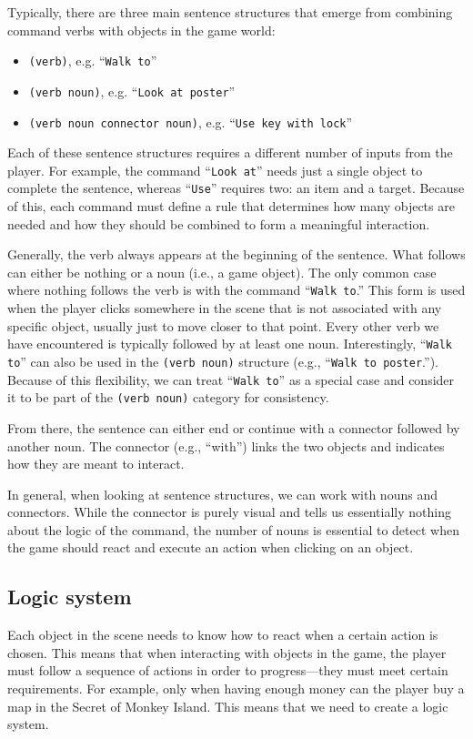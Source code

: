 Typically, there are three main sentence structures that emerge from combining command verbs with objects in the game world:
\begin{itemize}
    \item \verb|(verb)|, e.g. “\texttt{Walk to}”
    \item \verb|(verb noun)|, e.g. “\texttt{Look at poster}”
    \item \verb|(verb noun connector noun)|, e.g. “\texttt{Use key with lock}”
\end{itemize}

Each of these sentence structures requires a different number of inputs from the player. For example, the command “\texttt{Look at}” needs just a single object to complete the sentence, whereas “\texttt{Use}” requires two: an item and a target. Because of this, each command must define a rule that determines how many objects are needed and how they should be combined to form a meaningful interaction.

Generally, the verb always appears at the beginning of the sentence. What follows can either be nothing or a noun (i.e., a game object). The only common case where nothing follows the verb is with the command “\texttt{Walk to}.” This form is used when the player clicks somewhere in the scene that is not associated with any specific object, usually just to move closer to that point. Every other verb we have encountered is typically followed by at least one noun. Interestingly, “\texttt{Walk to}” can also be used in the \verb|(verb noun)| structure (e.g., “\texttt{Walk to poster}.”). Because of this flexibility, we can treat “\texttt{Walk to}” as a special case and consider it to be part of the \verb|(verb noun)| category for consistency.

From there, the sentence can either end or continue with a connector followed by another noun. The connector (e.g., “with”) links the two objects and indicates how they are meant to interact.

In general, when looking at sentence structures, we can work with nouns and connectors. While the connector is purely visual and tells us essentially nothing about the logic of the command, the number of nouns is essential to detect when the game should react and execute an action when clicking on an object. 

\subsection{Logic system}
Each object in the scene needs to know how to react when a certain action is chosen. This means that when interacting with objects in the game, the player must follow a sequence of actions in order to progress—they must meet certain requirements. For example, only when having enough money can the player buy a map in the Secret of Monkey Island. This means that we need to create a logic system.

